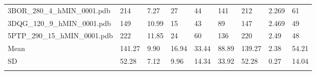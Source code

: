 \documentclass{bioinfo}
\begin{document}
\begin{table*}[!t]
{\begin{tabular}{lllllllll}
    3BOR\_280\_4\_hMIN\_0001.pdb & 214      & 7.27       & 27          & 44          & 141         & 212     & 2.269           & 61           \\
    3DQG\_120\_9\_hMIN\_0001.pdb & 149      & 10.99      & 15          & 43          & 89          & 147     & 2.469           & 49           \\
    5PTP\_290\_15\_hMIN\_0001.pdb & 222      & 11.85      & 24          & 60          & 136         & 220     & 2.49            & 48           \\ \midrule
    Mean                      & 141.27 & 9.90  & 16.94      & 33.44       & 88.89       & 139.27      & 2.38    & 54.21            \\
    SD                        & 52.28    & 7.12       & 9.96        & 14.34       & 33.92       & 52.28   & 0.27            & 14.04        \\ \botrule
\end{tabular}}{}
\end{table*}
\end{document}
